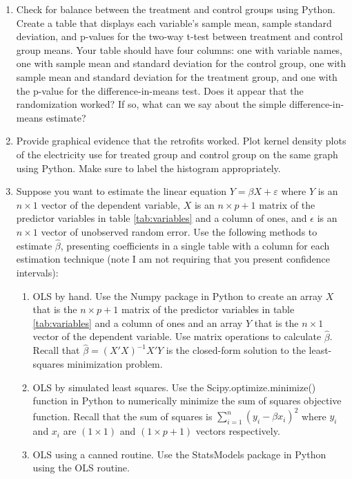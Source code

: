 \documentclass{article}
\begin{document}
\begin{enumerate}
    \item Check for balance between the treatment and control groups using Python.  Create a table that displays each variable's sample mean, sample standard deviation, and p-values for the two-way t-test between treatment and control group means.  Your table should have four columns: one with variable names, one with sample mean and standard deviation for the control group, one with sample mean and standard deviation for the treatment group, and one with the p-value for the difference-in-means test.  Does it appear that the randomization worked?  If so, what can we say about the simple difference-in-means estimate?
    \item Provide graphical evidence that the retrofits worked.  Plot kernel density plots of the electricity use for treated group and control group on the same graph using Python.  Make sure to label the histogram appropriately.
    \item Suppose you want to estimate the linear equation $Y = \beta X + \varepsilon$ where $Y$ is an $n \times 1$ vector of the dependent variable, $X$ is an $n \times p + 1$ matrix of the predictor variables in table \ref{tab:variables} and a column of ones, and $\epsilon$ is an $n  \times 1$ vector of unobserved random error.  Use the following methods to estimate $\hat{\beta}$, presenting coefficients in a single table with a column for each estimation technique (note I am not requiring that you present confidence intervals):
        \begin{enumerate}[label=(\alph*)]
            \item OLS by hand.  Use the Numpy package in Python to create an array $X$ that is the $n \times p + 1$ matrix of the predictor variables in table \ref{tab:variables} and a column of ones and an array $Y$ that is the $n \times 1$ vector of the dependent variable.  Use matrix operations to calculate $\hat{\beta}$.  Recall that $\hat{\beta} = (X'X)^{-1}X'Y$ is the closed-form solution to the least-squares minimization problem.
            \item OLS by simulated least squares.  Use the Scipy.optimize.minimize() function in Python to numerically minimize the sum of squares objective function.  Recall that the sum of squares is $\sum_{i=1}^n \left(y_i - \beta x_i \right)^2$ where $y_i$ and $x_i$ are $(1\times 1)$ and $(1\times p+1)$ vectors respectively.
            \item OLS using a canned routine.  Use the StatsModels package in Python using the OLS routine.
        \end{enumerate}
            
\end{enumerate}
\end{document}
